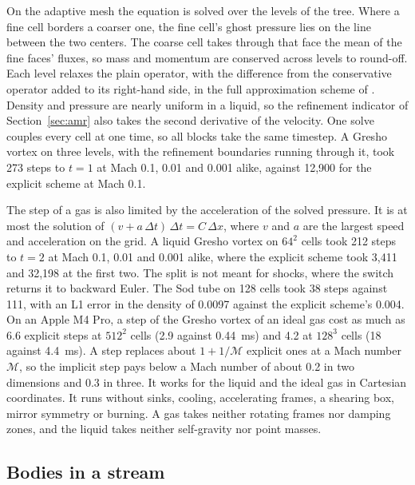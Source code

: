 \documentclass[twocolumn]{aastex701}
\begin{document}
On the adaptive mesh the equation is solved over the levels of the tree. Where a fine cell borders a coarser one, the fine cell's ghost pressure lies on the line between the two centers. The coarse cell takes through that face the mean of the fine faces' fluxes, so mass and momentum are conserved across levels to round-off. Each level relaxes the plain operator, with the difference from the conservative operator added to its right-hand side, in the full approximation scheme of \citet{Brandt1977}. Density and pressure are nearly uniform in a liquid, so the refinement indicator of Section~\ref{sec:amr} also takes the second derivative of the velocity. One solve couples every cell at one time, so all blocks take the same timestep. A Gresho vortex on three levels, with the refinement boundaries running through it, took 273 steps to $t = 1$ at Mach 0.1, 0.01 and 0.001 alike, against 12,900 for the explicit scheme at Mach 0.1.

The step of a gas is also limited by the acceleration of the solved pressure. It is at most the solution of $(v + a\,\Delta t)\,\Delta t = C\,\Delta x$, where $v$ and $a$ are the largest speed and acceleration on the grid. A liquid Gresho vortex on $64^2$ cells took 212 steps to $t = 2$ at Mach 0.1, 0.01 and 0.001 alike, where the explicit scheme took 3,411 and 32,198 at the first two. The split is not meant for shocks, where the switch returns it to backward Euler. The Sod tube on 128 cells took 38 steps against 111, with an L1 error in the density of 0.0097 against the explicit scheme's 0.004. On an Apple M4 Pro, a step of the Gresho vortex of an ideal gas cost as much as 6.6 explicit steps at $512^2$ cells (2.9 against 0.44~ms) and 4.2 at $128^3$ cells (18 against 4.4~ms). A step replaces about $1 + 1/\mathcal{M}$ explicit ones at a Mach number $\mathcal{M}$, so the implicit step pays below a Mach number of about 0.2 in two dimensions and 0.3 in three. It works for the liquid and the ideal gas in Cartesian coordinates. It runs without sinks, cooling, accelerating frames, a shearing box, mirror symmetry or burning. A gas takes neither rotating frames nor damping zones, and the liquid takes neither self-gravity nor point masses.

\subsection{Bodies in a stream}
\label{sec:bodies}
\end{document}
